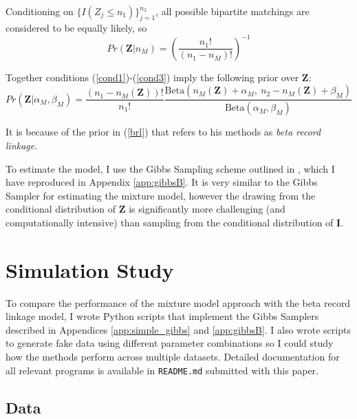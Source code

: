 \documentclass[11pt,reqno]{amsart}
\begin{document}
Conditioning on $\{I(Z_j \leq n_1)\}_{j=1}^{n_2}$, all possible bipartite matchings are considered to be equally likely, so \begin{equation} Pr\left(\mathbf{Z} | n_{M}\right) = \left(\frac{n_1!}{(n_1-n_{M})!}\right)^{-1} \label{cond3} \end{equation}

Together conditions (\ref{cond1})-(\ref{cond3}) imply the following prior over $\mathbf{Z}$:
\begin{equation}Pr(\mathbf{Z} | \alpha_M, \beta_M) = \frac{(n_1-n_{M}(\mathbf{Z}))!}{n_1!}\frac{\text{Beta}(n_{M}(\mathbf{Z}) + \alpha_M,\ n_2-n_{M}(\mathbf{Z}) + \beta_M)}{\text{Beta}(\alpha_M, \beta_M)} \label{brl} \end{equation}

It is because of the prior in (\ref{brl}) that \cite{sadinle_2017} refers to his methods as \textit{beta record linkage}. 

To estimate the model, I use the Gibbs Sampling scheme outlined in \cite{larsen_2005}, which I have reproduced in Appendix \ref{app:gibbsB}.  It is very similar to the Gibbs Sampler for estimating the mixture model, however the drawing  from the conditional distribution of $\mathbf{Z}$ is significantly more challenging (and computationally intensive) than sampling from the conditional distribution of $\mathbf{I}$.  

\section{Simulation Study}

To compare the performance of the mixture model approach with the beta record linkage model, I wrote Python scripts that implement the Gibbs Samplers described in Appendices \ref{app:simple_gibbs} and \ref{app:gibbsB}.  I also wrote scripts to generate fake data using different parameter combinations so I could study how the methods perform across multiple datasets.   Detailed documentation for all relevant programs is available in \texttt{README.md} submitted with this paper. 

\subsection{Data}
\end{document}
